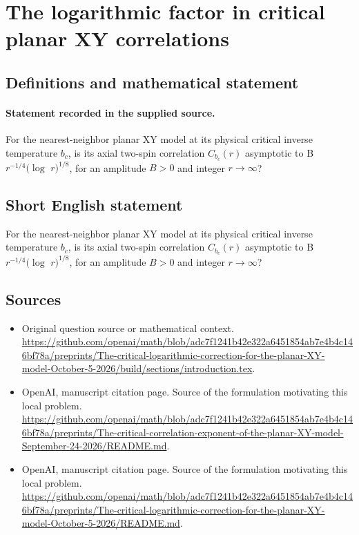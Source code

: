 \documentclass[11pt]{article}
\begin{document}
\section*{The logarithmic factor in critical planar XY correlations}\label{statement}
\subsection{Definitions and mathematical statement}
\paragraph{Statement recorded in the supplied source.}
For the nearest-neighbor planar XY model at its physical critical inverse temperature $b_c$, is its axial two-spin correlation $C_{b_c}(r)$ asymptotic to B $r^{-1/4}(\log $ $r)^{1/8}$, for an amplitude $B>0$ and integer $r\to \infty $?
\subsection{Short English statement}
For the nearest-neighbor planar XY model at its physical critical inverse temperature $b_c$, is its axial two-spin correlation $C_{b_c}(r)$ asymptotic to B $r^{-1/4}(\log $ $r)^{1/8}$, for an amplitude $B>0$ and integer $r\to \infty $?
\subsection{Sources}
\begin{itemize}
\item[S1] Original question source or mathematical context.
\url{https://github.com/openai/math/blob/adc7f1241b42e322a6451854ab7e4b4c146bf78a/preprints/The-critical-logarithmic-correction-for-the-planar-XY-model-October-5-2026/build/sections/introduction.tex}.
\item[S2] OpenAI, manuscript citation page. Source of the formulation motivating this local problem.
\url{https://github.com/openai/math/blob/adc7f1241b42e322a6451854ab7e4b4c146bf78a/preprints/The-critical-correlation-exponent-of-the-planar-XY-model-September-24-2026/README.md}.
\item[S3] OpenAI, manuscript citation page. Source of the formulation motivating this local problem.
\url{https://github.com/openai/math/blob/adc7f1241b42e322a6451854ab7e4b4c146bf78a/preprints/The-critical-logarithmic-correction-for-the-planar-XY-model-October-5-2026/README.md}.
\end{itemize}
\end{document}
